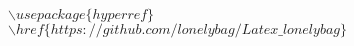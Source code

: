\documentclass{article}
\begin{document}
\noindent$\backslash usepackage\{hyperref\}$\\
$\backslash href\{https://github.com/lonelybag/Latex\_lonelybag\}$
\end{document}
